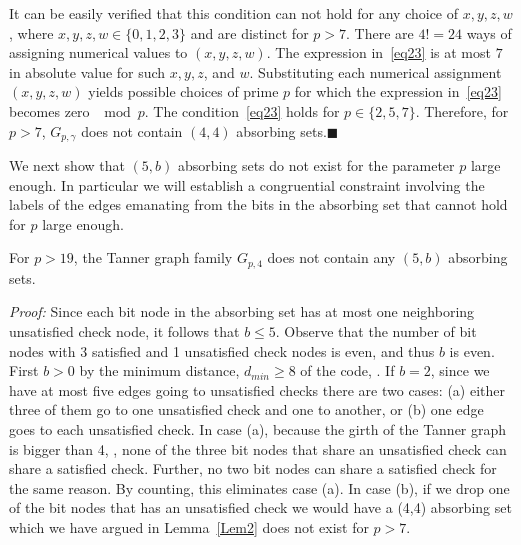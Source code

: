 It can be easily verified that this condition can not hold for any
choice of $x,y,z,w$, where $x,y,z,w \in \{0,1,2,3 \}$ and are
distinct for $p>7$. There are $4!=24$ ways of assigning numerical
values to $(x,y,z,w)$. The expression in~\eqref{eq23} is at most $7$
in absolute value for such $x,y,z$, and $w$.  Substituting each
numerical assignment $(x,y,z,w)$ yields possible choices of prime
$p$ for which the expression in~\eqref{eq23} becomes zero $\mod p$.
The condition~\eqref{eq23} holds for $p \in \{2,5,7\}$. Therefore,
for $p>7$, $G_{p,\gamma}$ does not contain $(4,4)$ absorbing
sets.\hfill$\blacksquare$


 We next show that $(5,b)$
absorbing sets do not exist for the parameter $p$ large enough. In
particular we will establish a congruential constraint involving the
labels of the edges emanating from the bits in the absorbing set
that cannot hold for $p$ large enough.
\begin{lemma}\label{Lem3} For $p>19$, the Tanner graph family $G_{p,4}$
does not contain any $(5,b)$ absorbing sets.
 \end{lemma}

\noindent \textit{Proof:} Since each bit node in the absorbing set
has at most one neighboring unsatisfied check node, it follows that
$b \leq 5$. Observe that the number of bit nodes with 3 satisfied
and 1 unsatisfied check nodes is even, and thus $b$ is even. First
$b>0$ by the minimum distance, $d_{min}\geq 8$ of the code,
\cite{helles}.  If $b=2$,
since we have at most five edges going to unsatisfied checks there
are two cases: (a) either three of them go to one unsatisfied check
and one to another, or (b) one edge goes to each unsatisfied check.
In case (a), because the girth of the Tanner graph is bigger than 4,
\cite{fan}, none of the three bit nodes that share an unsatisfied
check can share a satisfied check. Further, no two bit nodes can
share a satisfied check for the same reason. By counting, this
eliminates case (a). In case (b), if we drop one of the bit nodes
that has an unsatisfied check we would have a (4,4) absorbing set
which we have argued in Lemma~\ref{Lem2} does not exist for $p>7$.

